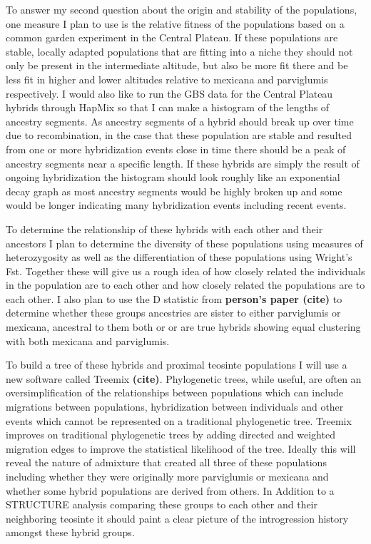 \documentclass[12pt]{amsart}
\begin{document}
To answer my second question about the origin and stability of the populations, one measure I plan to use is the relative fitness of the populations based on a common garden experiment in the Central Plateau. 
If these populations are stable, locally adapted populations that are fitting into a niche they should not only be present in the intermediate altitude, but also be more fit there and be less fit in higher and lower altitudes relative to mexicana and parviglumis respectively.
I would also like to run the GBS data for the Central Plateau hybrids through HapMix so that I can make a histogram of the lengths of ancestry segments.  
As ancestry segments of a hybrid should break up over time due to recombination, in the case that these population are stable and resulted from one or more hybridization events close in time there should be a peak of ancestry segments near a specific length.
If these hybrids are simply the result of ongoing hybridization the histogram should look roughly like an exponential decay graph as most ancestry segments would be highly broken up and some would be longer indicating many hybridization events including recent events.

To determine the relationship of these hybrids with each other and their ancestors I plan to determine the diversity of these populations using measures of heterozygosity as well as the differentiation of these populations using Wright's Fst.  
Together these will give us a rough idea of how closely related the individuals in the population are to each other and how closely related the populations are to each other.
I also plan to use the D statistic from \textbf{person's paper (cite)} to determine whether these groups ancestries are sister to either parviglumis or mexicana, ancestral to them both or or are true hybrids showing equal clustering with both mexicana and parviglumis.

To build a tree of these hybrids and proximal teosinte populations I will use a new software called Treemix \textbf{(cite)}.
Phylogenetic trees, while useful, are often an oversimplification of the relationships between populations which can include migrations between populations, hybridization between individuals and other events which cannot be represented on a traditional phylogenetic tree.
Treemix improves on traditional phylogenetic trees by adding directed and weighted migration edges to improve the statistical likelihood of the tree.
Ideally this will reveal the nature of admixture that created all three of these populations including whether they were originally more parviglumis or mexicana and whether some hybrid populations are derived from others.
In Addition to a STRUCTURE analysis comparing these groups to each other and their neighboring teosinte it should paint a clear picture of the introgression history amongst these hybrid groups.
\end{document}
